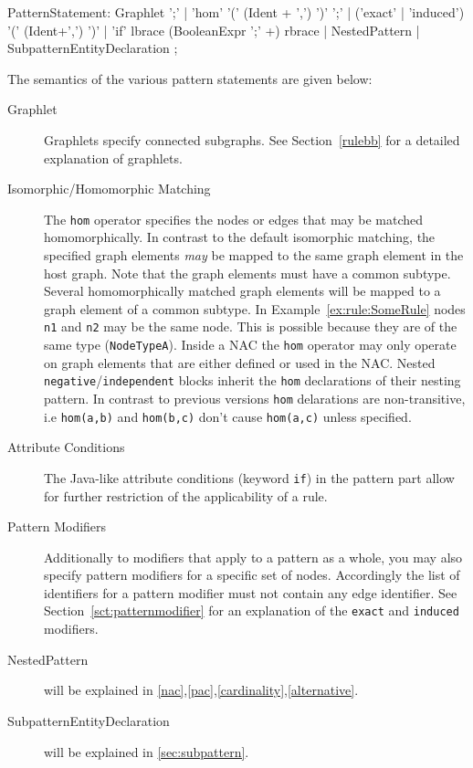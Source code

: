 \begin{rail}  
  PatternStatement: 
    Graphlet ';' |
    'hom' '(' (Ident + ',') ')' ';' |
    ('exact' | 'induced') '(' (Ident+',') ')' |
    'if' lbrace (BooleanExpr ';' +) rbrace |
    NestedPattern |
    SubpatternEntityDeclaration
    ;
\end{rail}
The semantics of the various pattern statements are given below:
\begin{description}
  \item[Graphlet] Graphlets specify connected subgraphs. See Section~\ref{rulebb} for a detailed explanation of graphlets.
  \item[Isomorphic/Homomorphic Matching] The \texttt{hom} operator specifies the nodes or edges that may be matched homomorphically. 
  In contrast to the default isomorphic matching, the specified graph elements \emph{may} be mapped to the same graph element in the host graph. Note that the graph elements must have a common subtype. 
  Several homomorphically matched graph elements will be mapped to a graph element of a common subtype.
  In Example~\ref{ex:rule:SomeRule} nodes \texttt{n1} and \texttt{n2} may be the same node. This is possible because they are of the same type (\texttt{NodeTypeA}).
  Inside a NAC the \texttt{hom} operator may only operate on graph elements that are either defined or used in the NAC.
  Nested \texttt{negative}/\texttt{independent} blocks inherit the \texttt{hom} declarations of their nesting pattern.
  In contrast to previous versions \texttt{hom} delarations are non-transitive, i.e \texttt{hom(a,b)} and \texttt{hom(b,c)} don't cause \texttt{hom(a,c)} unless specified.
  \item[Attribute Conditions] The Java-like attribute conditions (keyword \texttt{if}) in the pattern part allow for further restriction of the applicability of a rule.
  \item[Pattern Modifiers] Additionally to modifiers that apply to a pattern as a whole, you may also specify pattern modifiers for a specific set of nodes. Accordingly the list of identifiers for a pattern modifier must not contain any edge identifier. See Section~\ref{sct:patternmodifier} for an explanation of the \texttt{exact} and \texttt{induced} modifiers. 
  \item[NestedPattern] will be explained in \ref{nac},\ref{pac},\ref{cardinality},\ref{alternative}.
  \item[SubpatternEntityDeclaration] will be explained in \ref{sec:subpattern}.
\end{description}

